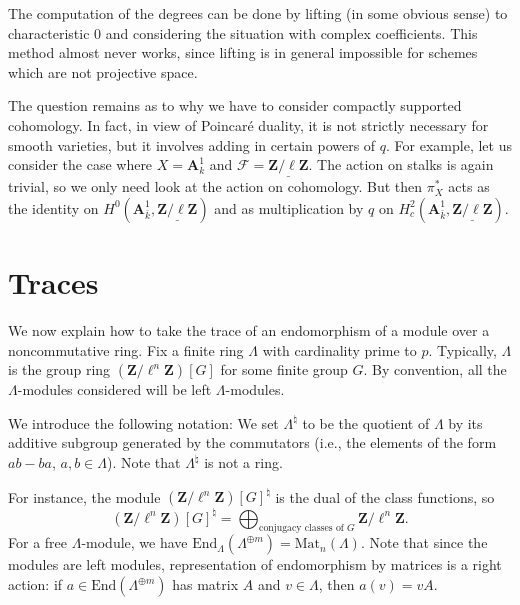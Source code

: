 \begin{remark}
\label{remark-compute-degree-lifting}
The computation of the degrees can be done by lifting (in some obvious sense)
to characteristic 0 and considering the situation with complex coefficients.
This method almost never works, since lifting is in general impossible for
schemes which are not projective space.
\end{remark}

\noindent
The question remains as to why we have to consider compactly supported
cohomology. In fact, in view of Poincar\'e duality, it is not strictly
necessary for smooth varieties, but it involves adding in certain powers
of $q$. For example, let us consider the case where
$X = \mathbf{A}^1_k$ and
$\mathcal{F} = \underline{\mathbf{Z}/\ell\mathbf{Z}}$.
The action on stalks is again trivial, so we only need look at the action
on cohomology. But then $\pi_X^*$ acts as the identity on
$H^0(\mathbf{A}^1_{\bar k}, \underline{\mathbf{Z}/\ell\mathbf{Z}})$
and as multiplication by $q$ on
$H^2_c(\mathbf{A}^1_{\bar k}, \underline{\mathbf{Z}/\ell\mathbf{Z}})$.




\section{Traces}
\label{section-traces}

\noindent
We now explain how to take the trace of an endomorphism of a module over a
noncommutative ring. Fix a finite ring $\Lambda$ with cardinality prime to $p$.
Typically, $\Lambda$ is the group ring $(\mathbf{Z}/\ell^n\mathbf{Z})[G]$ for
some finite group $G$. By convention, all the $\Lambda$-modules considered will
be left $\Lambda$-modules.

\medskip\noindent
We introduce the following notation:
We set $\Lambda^\natural$ to be the quotient of $\Lambda$ by its additive
subgroup generated by the commutators (i.e., the elements of the form
$ab-ba$, $a, b \in \Lambda$). Note that $\Lambda^\natural$ is not a ring.

\medskip\noindent
For instance, the module $(\mathbf{Z}/\ell^n\mathbf{Z})[G]^\natural$ is the
dual of the class functions, so
$$
(\mathbf{Z}/\ell^n\mathbf{Z})[G]^\natural
=
\bigoplus\nolimits_{\text{conjugacy classes of }G}
\mathbf{Z}/\ell^n\mathbf{Z}.
$$
For a free $\Lambda$-module, we have $\text{End}_\Lambda(\Lambda^{\oplus m}) =
\text{Mat}_n(\Lambda)$. Note that since the modules are left modules,
representation of endomorphism by matrices is a right action: if $a \in
\text{End}(\Lambda^{\oplus m})$ has matrix $A$ and $v \in \Lambda$, then $a(v)
= v A$.

